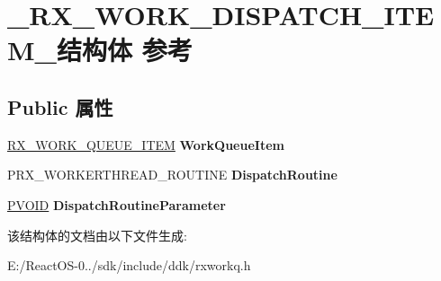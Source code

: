 \hypertarget{struct___r_x___w_o_r_k___d_i_s_p_a_t_c_h___i_t_e_m__}{}\section{\+\_\+\+R\+X\+\_\+\+W\+O\+R\+K\+\_\+\+D\+I\+S\+P\+A\+T\+C\+H\+\_\+\+I\+T\+E\+M\+\_\+结构体 参考}
\label{struct___r_x___w_o_r_k___d_i_s_p_a_t_c_h___i_t_e_m__}
\subsection*{Public 属性}
\begin{DoxyCompactItemize}
\item 
\mbox{\label{struct___r_x___w_o_r_k___d_i_s_p_a_t_c_h___i_t_e_m___a87f50819e2fec24b6288d16f92abc3da}} 
\hyperlink{struct___r_x___w_o_r_k___q_u_e_u_e___i_t_e_m__}{R\+X\+\_\+\+W\+O\+R\+K\+\_\+\+Q\+U\+E\+U\+E\+\_\+\+I\+T\+EM} {\bfseries Work\+Queue\+Item}
\item 
\mbox{\label{struct___r_x___w_o_r_k___d_i_s_p_a_t_c_h___i_t_e_m___ab591a8b31f3b40050998119f80ce9f90}} 
P\+R\+X\+\_\+\+W\+O\+R\+K\+E\+R\+T\+H\+R\+E\+A\+D\+\_\+\+R\+O\+U\+T\+I\+NE {\bfseries Dispatch\+Routine}
\item 
\mbox{\label{struct___r_x___w_o_r_k___d_i_s_p_a_t_c_h___i_t_e_m___ad2fd91310e8cbee2dab64a0d274f728c}} 
\hyperlink{interfacevoid}{P\+V\+O\+ID} {\bfseries Dispatch\+Routine\+Parameter}
\end{DoxyCompactItemize}


该结构体的文档由以下文件生成\+:\begin{DoxyCompactItemize}
\item 
E\+:/\+React\+O\+S-\/0../sdk/include/ddk/rxworkq.\+h\end{DoxyCompactItemize}
